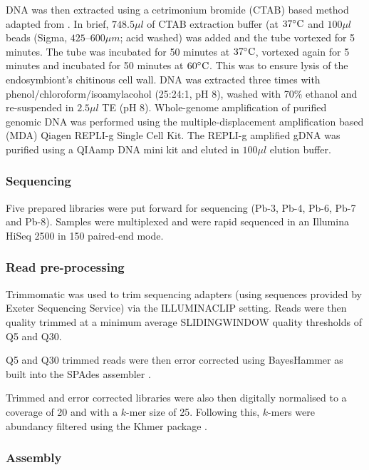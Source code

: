 DNA was then extracted using a cetrimonium bromide (CTAB) based method adapted from \citep{Winnepenninckx1993}. 
In brief,  \(748.5 \mu l\) of CTAB extraction buffer (at \(37\celsius\) and \(100 \mu l\) beads (Sigma, \(425 – 600 \mu m\); acid washed) 
was added and the tube vortexed for 5 minutes. 
The tube was incubated for 50 minutes at \(37\celsius\), 
vortexed again for 5 minutes and incubated for 50 minutes at \(60\celsius\).  
This was to ensure lysis of the endosymbiont's chitinous cell wall.
DNA was extracted three times with phenol/chloroform/isoamylacohol (25:24:1, pH 8), washed with 70\% ethanol and 
re-suspended in \(2.5 \mu l\) TE (pH 8). 
Whole-genome amplification of purified genomic DNA was performed using the multiple-displacement amplification based
(MDA) Qiagen REPLI-g Single Cell Kit. 
The REPLI-g amplified gDNA was purified using a QIAamp DNA mini kit and eluted in \(100 \mu l\) elution buffer.

\subsubsection{Sequencing}

Five prepared libraries were put forward for sequencing 
(Pb-3, Pb-4, Pb-6, Pb-7 and Pb-8).   Samples were
multiplexed and were rapid sequenced in an Illumina
HiSeq 2500 in \SI{150}{\bp} paired-end mode. 

\subsubsection{Read pre-processing}

Trimmomatic \citep{Bolger2014a} was used to trim sequencing adapters (using sequences
provided by Exeter Sequencing Service) via the ILLUMINACLIP setting.
Reads were then quality trimmed at a minimum average SLIDINGWINDOW 
quality thresholds of Q5 and Q30. 

Q5 and Q30 trimmed reads were then error corrected using BayesHammer
\citep{Nikolenko2013} as built into the SPAdes assembler \citep{Bankevich2012}.

Trimmed and error corrected libraries were also then digitally normalised
\citep{Brown2012} to a coverage of 20 and with a \(k\)-mer size of 25.
Following this, \(k\)-mers were abundancy filtered \citep{Zhang2014,Zhang2015}
using the Khmer package \citep{Crusoe2015}.

\subsubsection{Assembly}

